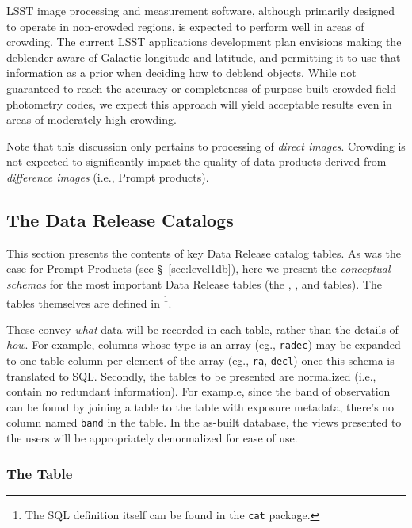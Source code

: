 \documentclass[SE,lsstdraft,toc]{lsstdoc}
\begin{document}
LSST image processing and measurement software, although primarily designed to operate in non-crowded regions, is expected to perform well in areas of crowding. The current LSST applications development plan envisions making the deblender aware of Galactic longitude and latitude, and permitting it to use that information as a prior when deciding how to deblend objects. While not guaranteed to reach the accuracy or completeness of purpose-built crowded field photometry codes, we expect this approach will yield acceptable results even in areas of moderately high crowding.

Note that this discussion only pertains to processing of \emph{direct images}. Crowding is not expected to significantly impact the quality of data products derived from \emph{difference images} (i.e., Prompt products).

\subsection{The Data Release Catalogs}

This section presents the contents of key Data Release catalog tables. As was the case for Prompt Products (see \S~\ref{sec:level1db}), here we present the \emph{conceptual schemas} for the most important Data Release tables (the \Object, \Source, and \ForcedSource tables).
The tables themselves are defined in \footnote{The SQL definition itself can be found in the \texttt{cat} package.}.

These convey \emph{what} data will be recorded in each table, rather than the details of \emph{how}. For example, columns whose type is an array (eg., \texttt{radec}) may be expanded to one table column per element of the array (eg., \texttt{ra}, \texttt{decl}) once this schema is translated to SQL. Secondly, the tables to be presented are normalized (i.e., contain no redundant information). For example, since the band of observation can be found by joining a \Source table to the table with exposure metadata, there's no column named \texttt{band} in the \Source table. In the as-built database, the views presented to the users will be appropriately denormalized for ease of use.

\subsubsection{The \Object Table}
\label{sec:objectTable}
\end{document}
